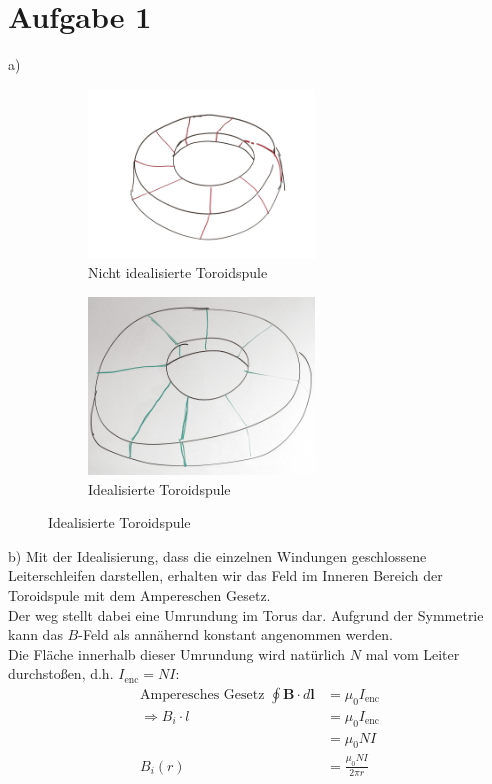 \documentclass[11pt a4paper]{article}
\begin{document}
\thispagestyle{fancy}
\section*{Aufgabe 1}
a)
\begin{figure}[H]
	\centering
	\begin{subfigure}[b]{0.3\textwidth}
		\includegraphics[width=6cm]{1_1.jpg}
		\caption{Nicht idealisierte Toroidspule}
	\end{subfigure}
	\quad
	\begin{subfigure}[b]{0.3\textwidth}
		\includegraphics[width=6cm]{1_2.jpg}
		\caption{Idealisierte Toroidspule}
	\end{subfigure}
\end{figure}

b) Mit der Idealisierung, dass die einzelnen Windungen geschlossene
Leiterschleifen darstellen, erhalten wir das Feld im Inneren Bereich der 
Toroidspule mit dem Ampereschen Gesetz. \\
Der weg stellt dabei eine Umrundung im Torus dar. Aufgrund der Symmetrie
kann das $B$-Feld als annähernd konstant angenommen werden.\\
Die Fläche innerhalb dieser Umrundung wird natürlich $N$ mal vom Leiter
durchstoßen, d.h. $I_\text{enc} = NI$:
\begin{align*}
	\text{Amperesches Gesetz } \oint \mathbf B \cdot d\mathbf l &=
	\mu_0 I_\text{enc} \\
	\Rightarrow
	B_i \cdot l 	&= \mu_0 I_\text{enc} \\
			&= \mu_0 NI \\
	B_i(r) 		&= \frac{\mu_0 NI}{2\pi r}
\end{align*}
\end{document}
